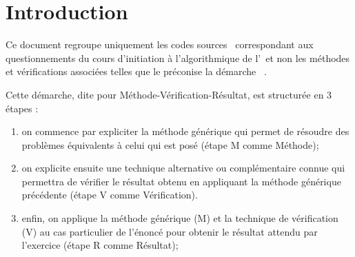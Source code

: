 \documentclass[11pt,a4paper,colorlinks,breaklinks]{article}
\renewcommand{\headrulewidth}{0pt}
\renewcommand{\footrulewidth}{0pt}
\begin{document}
\pagestyle{fancy}
\fancyhead{}
\fancyhead[R]{\thepage/\pageref{LastPage}}
\fancyfoot{}
\fancyfoot[L]{}
\fancyfoot[C]{}
\fancyfoot[R]{}
\setlength{\headheight}{47pt}
\setlength{\footskip}{38pt}
\renewcommand{\headrulewidth}{0pt}
\renewcommand{\footrulewidth}{0pt}

\setcounter{tocdepth}{2}
\tableofcontents

\newpage
\section{Introduction}\label{sec:introduction}
Ce document regroupe uniquement les codes sources \python\ correspondant 
aux questionnements \cite{questionnements} du cours d'initiation à
l'algorithmique \cite{cours} de l'\enib\ et non les méthodes 
et vérifications associées telles que le préconise la démarche \mvr\ \cite{mvr}.

Cette démarche, dite \mvr{} pour Méthode-Vérification-Résultat, est structurée en 3 étapes : 
\begin{enumerate}
\item on commence par expliciter la méthode générique qui permet de résoudre 
	des problèmes équivalents à celui qui est posé 
	(étape M comme Méthode);

\item on explicite ensuite une technique alternative ou complémentaire connue
	qui permettra de vérifier le résultat obtenu en appliquant la méthode générique 
	précédente
	(étape V comme Vérification).

\item enfin, on applique la méthode générique (M) et la technique de vérification (V)
	au cas particulier de l'énoncé pour obtenir le résultat attendu par l'exercice
	(étape R comme Résultat);
\end{enumerate}
\end{document}
